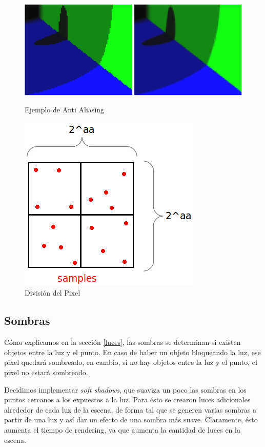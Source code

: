 \documentclass[a4paper,10pt]{article}
\begin{document}
\begin{figure}[ht]
\begin{minipage}[b]{0.5\linewidth}
\centering
\includegraphics[scale=0.23]{aa_muestra.png}
\caption{Ejemplo de Anti Aliasing}
\label{fig:figure7}
\end{minipage}
\hspace{0.5cm}
\begin{minipage}[b]{0.5\linewidth}
\centering
\includegraphics[scale=0.40]{aa_samples.png}
\caption{Divisi\'on del Pixel}
\label{fig:figure8}
\end{minipage}
\end{figure}

\subsection{Sombras}

C\'omo explicamos en la secci\'on \ref{luces}, las sombras se determinan si
existen objetos entre la luz y el punto.  En caso de haber un objeto bloqueando
la luz, ese pixel quedar\'a sombreado, en cambio, si no hay objetos entre la
luz y el punto, el pixel no estar\'a sombreado.

Decidimos implementar \emph{soft shadows}, que suaviza un poco las sombras en
los puntos cercanos a los expuestos a la luz. Para \'esto se crearon luces adicionales
alrededor de cada luz de la escena, de forma tal que se generen varias sombras a
partir de una luz y as\'i dar un efecto de una sombra m\'as suave. Claramente, 
\'esto aumenta el tiempo de rendering, ya que aumenta la cantidad de luces en
la escena.
\end{document}
